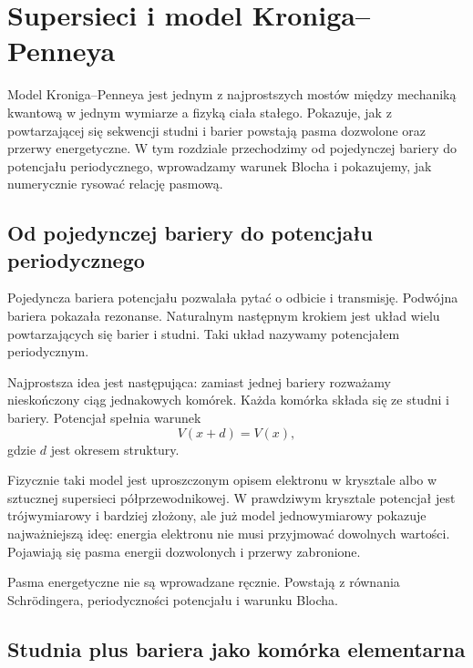 \chapter{Supersieci i model Kroniga--Penneya}

\begin{summarybox}
Model Kroniga--Penneya jest jednym z najprostszych mostów między mechaniką
kwantową w jednym wymiarze a fizyką ciała stałego. Pokazuje, jak z powtarzającej
się sekwencji studni i barier powstają pasma dozwolone oraz przerwy energetyczne.
W tym rozdziale przechodzimy od pojedynczej bariery do potencjału periodycznego,
wprowadzamy warunek Blocha i pokazujemy, jak numerycznie rysować relację
pasmową.
\end{summarybox}

\section{Od pojedynczej bariery do potencjału periodycznego}

Pojedyncza bariera potencjału pozwalała pytać o odbicie i transmisję. Podwójna bariera pokazała rezonanse. Naturalnym następnym krokiem jest układ wielu powtarzających się barier i studni. Taki układ nazywamy potencjałem periodycznym.

Najprostsza idea jest następująca: zamiast jednej bariery rozważamy nieskończony ciąg jednakowych komórek. Każda komórka składa się ze studni i bariery. Potencjał spełnia warunek
\begin{equation}
    V(x+d)=V(x),
\end{equation}
gdzie \(d\) jest okresem struktury.

Fizycznie taki model jest uproszczonym opisem elektronu w krysztale albo w sztucznej supersieci półprzewodnikowej. W prawdziwym krysztale potencjał jest trójwymiarowy i bardziej złożony, ale już model jednowymiarowy pokazuje najważniejszą ideę: energia elektronu nie musi przyjmować dowolnych wartości. Pojawiają się pasma energii dozwolonych i przerwy zabronione.

\begin{remarkbox}
Pasma energetyczne nie są wprowadzane ręcznie. Powstają z równania Schrödingera, periodyczności potencjału i warunku Blocha.
\end{remarkbox}

\section{Studnia plus bariera jako komórka elementarna}

